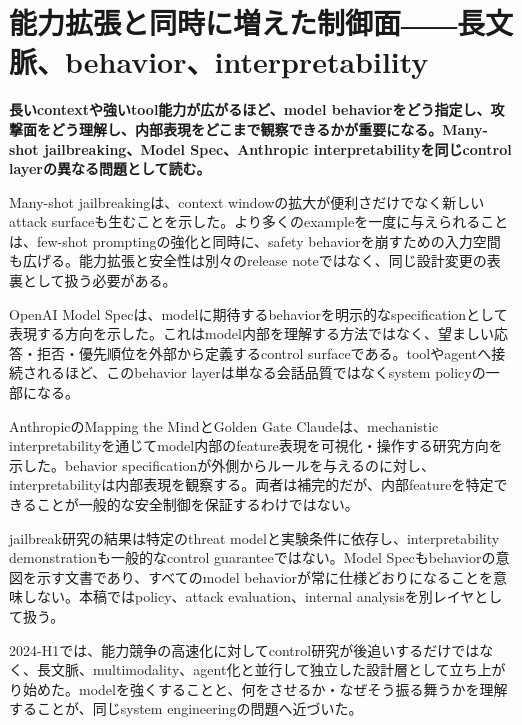\section{能力拡張と同時に増えた制御面――長文脈、behavior、interpretability}
\label{pkg:safety-control}
\noindent\textbf{長いcontextや強いtool能力が広がるほど、model behaviorをどう指定し、攻撃面をどう理解し、内部表現をどこまで観察できるかが重要になる。Many-shot jailbreaking、Model Spec、Anthropic interpretabilityを同じcontrol layerの異なる問題として読む。}\autocite{src-018fb3abd44d,src-4ff5ab7d45bc,src-d1406200c99e}

Many-shot jailbreakingは、context windowの拡大が便利さだけでなく新しいattack surfaceも生むことを示した。より多くのexampleを一度に与えられることは、few-shot promptingの強化と同時に、safety behaviorを崩すための入力空間も広げる。能力拡張と安全性は別々のrelease noteではなく、同じ設計変更の表裏として扱う必要がある。\autocite{src-018fb3abd44d,src-28ee6f0f00f4,src-e91e6f80eaac}


OpenAI Model Specは、modelに期待するbehaviorを明示的なspecificationとして表現する方向を示した。これはmodel内部を理解する方法ではなく、望ましい応答・拒否・優先順位を外部から定義するcontrol surfaceである。toolやagentへ接続されるほど、このbehavior layerは単なる会話品質ではなくsystem policyの一部になる。\autocite{src-d1406200c99e}


AnthropicのMapping the MindとGolden Gate Claudeは、mechanistic interpretabilityを通じてmodel内部のfeature表現を可視化・操作する研究方向を示した。behavior specificationが外側からルールを与えるのに対し、interpretabilityは内部表現を観察する。両者は補完的だが、内部featureを特定できることが一般的な安全制御を保証するわけではない。\autocite{src-4ff5ab7d45bc}


\begin{claimboundary}
jailbreak研究の結果は特定のthreat modelと実験条件に依存し、interpretability demonstrationも一般的なcontrol guaranteeではない。Model Specもbehaviorの意図を示す文書であり、すべてのmodel behaviorが常に仕様どおりになることを意味しない。本稿ではpolicy、attack evaluation、internal analysisを別レイヤとして扱う。\autocite{src-018fb3abd44d,src-4ff5ab7d45bc,src-5019b9256d83,src-d1406200c99e}
\end{claimboundary}

2024-H1では、能力競争の高速化に対してcontrol研究が後追いするだけではなく、長文脈、multimodality、agent化と並行して独立した設計層として立ち上がり始めた。modelを強くすることと、何をさせるか・なぜそう振る舞うかを理解することが、同じsystem engineeringの問題へ近づいた。\autocite{src-018fb3abd44d,src-28ee6f0f00f4,src-4ff5ab7d45bc,src-d1406200c99e,src-e91e6f80eaac}
